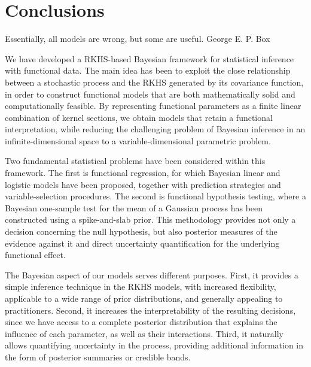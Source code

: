 \chapter{Conclusions}\label{ch:conclusions}


\begin{flushquote}
    {Essentially, all models are wrong, but some are useful.}
    {George E. P. Box}
\end{flushquote}

We have developed a \acs{RKHS}-based Bayesian framework for statistical inference with functional data. The main idea has been to exploit the close relationship between a stochastic process and the \acs{RKHS} generated by its covariance function, in order to construct functional models that are both mathematically solid and computationally feasible. By representing functional parameters as a finite linear combination of kernel sections, we obtain models that retain a functional interpretation, while reducing the challenging problem of Bayesian inference in an infinite-dimensional space to a variable-dimensional parametric problem.

Two fundamental statistical problems have been considered within this framework. The first is functional regression, for which Bayesian linear and logistic models have been proposed, together with prediction strategies and variable-selection procedures. The second is functional hypothesis testing, where a Bayesian one-sample test for the mean of a Gaussian process has been constructed using a spike-and-slab prior. This methodology provides not only a decision concerning the null hypothesis, but also posterior measures of the evidence against it and direct uncertainty quantification for the underlying functional effect.

The Bayesian aspect of our models serves different purposes. First, it provides a simple inference technique in the \acs{RKHS} models, with increased flexibility, applicable to a wide range of prior distributions, and generally appealing to practitioners. Second, it increases the interpretability of the resulting decisions, since we have access to a complete posterior distribution that explains the influence of each parameter, as well as their interactions. Third, it naturally allows quantifying uncertainty in the process, providing additional information in the form of posterior summaries or credible bands.


